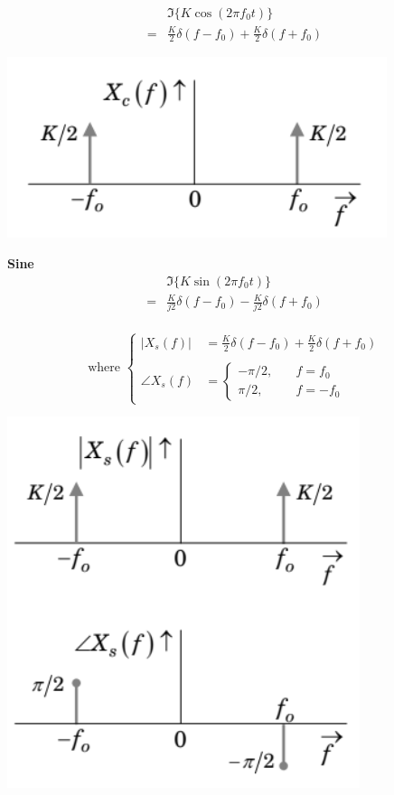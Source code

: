 \documentclass[6pt,landscape,a4paper]{extarticle}
\newenvironment{Figure}
  {\par\medskip\noindent\minipage{\linewidth}}
  {\endminipage\par\medskip}
\begin{document}
\begin{multicols*}{5}
\begin{align*}
        &\Im\{K\cos{(2\pi f_0t)}\}\\
        =&\frac{K}{2}\delta(f-f_0)+\frac{K}{2}\delta(f+f_0)
    \end{align*}
    \begin{Figure}
        \centering
        \includegraphics[width=0.8\linewidth]{images/continuousFreqSpectrum_Cos.png}
    \end{Figure}
    \textbf{Sine}
    \begin{align*}
        &\Im\{K\sin(2\pi f_0 t)\}\\
        = &\frac{K}{j2}\delta(f-f_0) - \frac{K}{j2}\delta(f+f_0)
    \end{align*}\\
    \[
    \text{where }
        \begin{cases}
             |X_s(f)|&=\frac{K}{2}\delta(f-f_0) + \frac{K}{2}\delta(f+f_0)\\\\
             \angle X_s(f)&= \begin{cases}
                 -\pi/2, &\quad f=f_0\\
                 \pi/2, &\quad f=-f_0
             \end{cases}
        \end{cases}
    \]
    \begin{Figure}
        \centering
        \includegraphics[width=0.8\linewidth]{images/continuousFreqSpectrum_Sine.png}

\end{Figure}
\end{multicols*}
\end{document}
